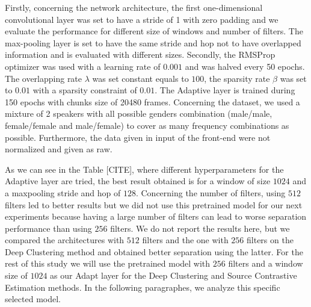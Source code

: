 \documentclass[master, tikz, final,11pt, dvipdfmx]{iscs-thesis}
\begin{document}
Firstly, concerning the network architecture, the first one-dimensional convolutional layer was set to have a stride of 1 with zero padding and we evaluate the performance for different size of windows and number of filters. The max-pooling layer is set to have the same stride and hop not to have overlapped information and is evaluated with different sizes. 
Secondly, the RMSProp optimizer was used with a learning rate of $0.001$ and was halved every 50 epochs. The overlapping rate $\lambda$ was set constant equals to $100$, the sparsity rate $\beta$ was set to $0.01$ with a sparsity constraint of $0.01$. 
The Adaptive layer is trained during 150 epochs with chunks size of 20480 frames.
Concerning the dataset, we used a mixture of 2 speakers with all possible genders combination (male/male, female/female and male/female) to cover as many frequency combinations as possible. Furthermore, the data given in input of the front-end were not normalized and given as raw. 

	
As we can see in the Table [CITE], where different hyperparameters for the Adaptive layer are tried, the best result obtained is for a window of size $1024$ and a maxpooling stride and hop of $128$. Concerning the number of filters, using $512$ filters led to better results but we did not use this pretrained model for our next experiments because having a large number of filters can lead to worse separation performance than using $256$ filters. We do not report the results here, but we compared the architectures with $512$ filters and the one with $256$ filters on the Deep Clustering method and obtained better separation using the latter.
For the rest of this study we will use the pretrained model with $256$ filters and a window size of $1024$ as our Adapt layer for the Deep Clustering and Source 
Contrastive Estimation methods. In the following paragraphes, we analyze this specific selected model.
\end{document}
